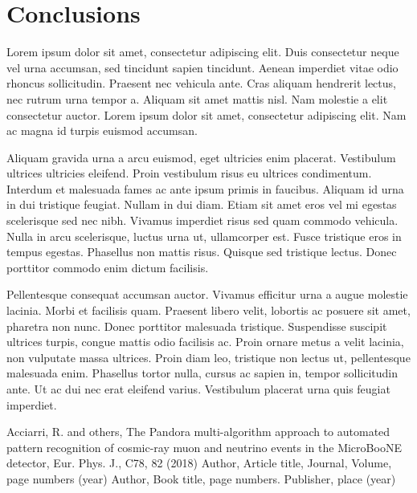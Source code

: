 \section{Conclusions}

Lorem ipsum dolor sit amet, consectetur adipiscing elit. Duis consectetur neque vel urna accumsan, sed tincidunt sapien tincidunt. Aenean imperdiet vitae odio rhoncus sollicitudin. Praesent nec vehicula ante. Cras aliquam hendrerit lectus, nec rutrum urna tempor a. Aliquam sit amet mattis nisl. Nam molestie a elit consectetur auctor. Lorem ipsum dolor sit amet, consectetur adipiscing elit. Nam ac magna id turpis euismod accumsan.

Aliquam gravida urna a arcu euismod, eget ultricies enim placerat. Vestibulum ultrices ultricies eleifend. Proin vestibulum risus eu ultrices condimentum. Interdum et malesuada fames ac ante ipsum primis in faucibus. Aliquam id urna in dui tristique feugiat. Nullam in dui diam. Etiam sit amet eros vel mi egestas scelerisque sed nec nibh. Vivamus imperdiet risus sed quam commodo vehicula. Nulla in arcu scelerisque, luctus urna ut, ullamcorper est. Fusce tristique eros in tempus egestas. Phasellus non mattis risus. Quisque sed tristique lectus. Donec porttitor commodo enim dictum facilisis.

Pellentesque consequat accumsan auctor. Vivamus efficitur urna a augue molestie lacinia. Morbi et facilisis quam. Praesent libero velit, lobortis ac posuere sit amet, pharetra non nunc. Donec porttitor malesuada tristique. Suspendisse suscipit ultrices turpis, congue mattis odio facilisis ac. Proin ornare metus a velit lacinia, non vulputate massa ultrices. Proin diam leo, tristique non lectus ut, pellentesque malesuada enim. Phasellus tortor nulla, cursus ac sapien in, tempor sollicitudin ante. Ut ac dui nec erat eleifend varius. Vestibulum placerat urna quis feugiat imperdiet.



\begin{thebibliography}{}
%
%
Acciarri, R. and others, The Pandora multi-algorithm approach to automated pattern recognition of cosmic-ray muon and neutrino events in the MicroBooNE detector, Eur. Phys. J., C78, 82 (2018)
Author, Article title, Journal, Volume, page numbers (year)
Author, Book title, page numbers. Publisher, place (year)
\end{thebibliography}



